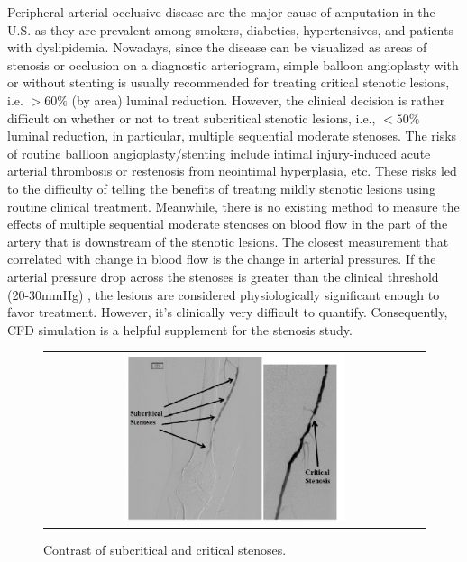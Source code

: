 Peripheral arterial occlusive disease are the major cause of amputation in the U.S. as they are prevalent among smokers, diabetics, hypertensives, and patients with dyslipidemia. Nowadays, since the disease can be visualized as areas of stenosis or occlusion on a diagnostic arteriogram, simple balloon angioplasty with or without stenting is usually recommended for treating critical stenotic lesions, i.e. $ > 60\% $ (by area) luminal reduction. However, the clinical decision is rather difficult on whether or not to treat subcritical stenotic lesions, i.e., $ < 50\% $ luminal reduction, in particular, multiple sequential moderate stenoses. The risks of routine ballloon angioplasty/stenting include intimal injury-induced acute arterial thrombosis or restenosis\cite{holmes1984restenosis} from neointimal hyperplasia\cite{kornowski1998stent}, etc. These risks led to the difficulty of telling the benefits of treating mildly stenotic lesions using routine clinical treatment. Meanwhile, there is no existing method to measure the effects of multiple sequential moderate stenoses on blood flow in the part of the artery that is downstream of the stenotic lesions. The closest measurement that correlated with change in blood flow is the change in arterial pressures. If the arterial pressure drop across the stenoses is greater than the clinical threshold (20-30mmHg) \cite{meuwissen2002hyperemic}, the lesions are considered physiologically significant enough to favor treatment. However, it's clinically very difficult to quantify. Consequently, CFD simulation is a helpful supplement for the stenosis study.

\begin{figure}[H]
	\centering
	\begin{tabular}{c}
		\includegraphics[width=0.6\textwidth]{./pics/photo.png}
	\end{tabular}
	\caption{\footnotesize Contrast of subcritical and critical stenoses.}
	\label{fig: patient CT}
\end{figure}

